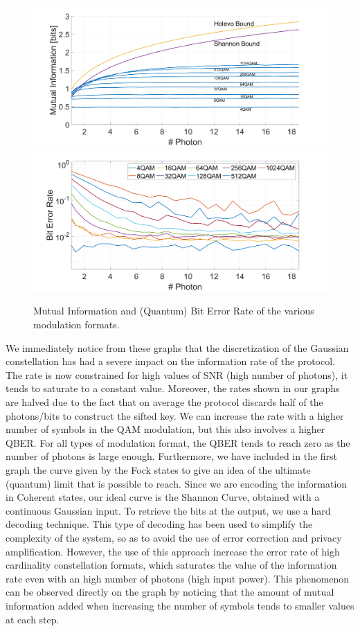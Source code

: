 \documentclass[journal, letterpaper]{IEEEtran}
\begin{document}
\begin{figure}[!h]
    \centering
    \includegraphics[width=\linewidth]{capacity_qber/capacity_example_2.png}
    \includegraphics[width=\linewidth]{capacity_qber/error_rate_example.png}
    \caption{Mutual Information and (Quantum) Bit Error Rate of the various modulation formats.}
    \label{fig:enter-label}
\end{figure}

We immediately notice from these graphs that the discretization of the Gaussian constellation has had a severe impact on the information rate of the protocol. The rate is now constrained for high values of SNR (high number of photons), it tends to saturate to a constant value. Moreover, the rates shown in our graphs are halved due to the fact that on average the protocol discards half of the photons/bits to construct the sifted key. We can increase the rate with a higher number of symbols in the QAM modulation, but this also involves a higher QBER. For all types of modulation format, the QBER tends to reach zero as the number of photons is large enough. Furthermore, we have included in the first graph the curve given by the Fock states to give an idea of the ultimate (quantum) limit that is possible to reach. Since we are encoding the information in Coherent states, our ideal curve is the Shannon Curve, obtained with a continuous Gaussian input. To retrieve the bits at the output, we use a hard decoding technique. This type of decoding has been used to simplify the complexity of the system, so as to avoid the use of error correction and privacy amplification. However, the use of this approach increase the error rate of high cardinality constellation formats, which saturates the value of the information rate even with an high number of photons (high input power). This phenomenon can be observed directly on the graph by noticing that the amount of mutual information added when increasing the number of symbols tends to smaller values at each step. 
\end{document}
